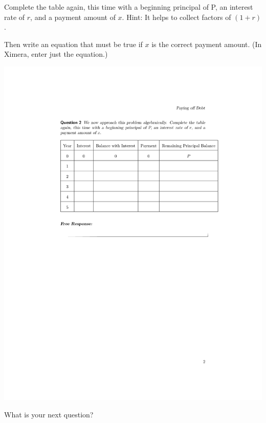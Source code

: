 \documentclass[handout,space,nooutcomes]{ximera}
\begin{document}
\begin{question}[.5in]
Complete the table again, this time with a beginning principal of P, an interest rate of $r$,
and a payment amount of $x$.  Hint: It helps to collect factors of $(1+r)$.

Then write an equation that must be true if $x$ is the correct
payment amount.   (In Ximera, enter just the equation.)

\includegraphics{payingOffDebtTableGraphic2.pdf}

\begin{freeResponse}
\end{freeResponse}
\end{question}

\begin{question}
What is your next question?   
\begin{freeResponse}
\end{freeResponse}
\end{question}
\end{document}
